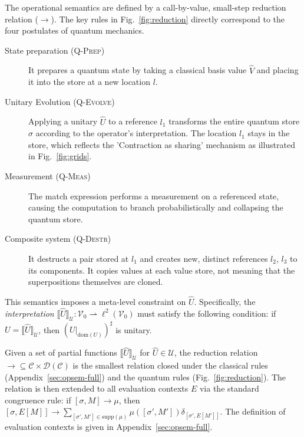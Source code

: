 The operational semantics are defined by a call-by-value, small-step reduction relation ($\longrightarrow$).
The key rules in Fig.~\ref{fig:reduction} directly correspond to the four postulates of quantum mechanics\cite{NIELSEN2010_QuantumComputationQuantum}.
\begin{description}
  \item[State preparation (\textsc{Q-Prep})] It prepares a quantum state by taking a classical basis value $\hat{V}$ and placing it into the store at a new location $l$.
  \item[Unitary Evolution (\textsc{Q-Evolve})] Applying a unitary $\hat{U}$ to a reference $l_1$ transforms the entire quantum store $\sigma$ according to the operator's interpretation.
        The location $l_1$ stays in the store, which reflects the 'Contraction as sharing' mechanism as illustrated in Fig.~\ref{fig:grids}.
  \item[Measurement (\textsc{Q-Meas})] The match expression performs a measurement on a referenced state, causing the computation to branch probabilistically and collapsing the quantum store.
  \item[Composite system (\textsc{Q-Destr})] It destructs a pair stored at $l_1$ and creates new, distinct references $l_2$, $l_3$ to its components.
        It copies values at each value store, not meaning that the superpositions themselves are cloned.
\end{description}

This semantics imposes a meta-level constraint on $\hat{U}$.
Specifically, the \textit{interpretation} $\llbracket\hat{U}\rrbracket_\mathcal{U} : \mathcal{V}_0\rightharpoonup \ell^2(\mathcal{V}_0)$ must satisfy the following condition: if $U = \llbracket\hat{U}\rrbracket_\mathcal{U}$, then $(U|_{\mathrm{dom}(U)})^\sharp$ is unitary.
\begin{dfn} \label{def:single-step}
  Given a set of partial functions $\llbracket\hat{U}\rrbracket_\mathcal{U}$ for $\hat{U}\in\mathcal{U}$, the reduction relation $\longrightarrow \subseteq \mathcal{C}\times \mathcal{D}(\mathcal{C})$ is the smallest relation closed under the classical rules (Appendix~\ref{sec:opsem-full}) and the quantum rules (Fig.~\ref{fig:reduction}).
  The relation is then extended to all evaluation contexts $E$ via the standard congruence rule: if $[\sigma,M] \longrightarrow \mu$, then $[\sigma,E[M]] \longrightarrow \sum_{[\sigma',M']\in\mathrm{supp}(\mu)}\mu([\sigma',M'])\delta_{[\sigma',E[M']]}$.
  The definition of evaluation contexts is given in Appendix~\ref{sec:opsem-full}.
\end{dfn}

